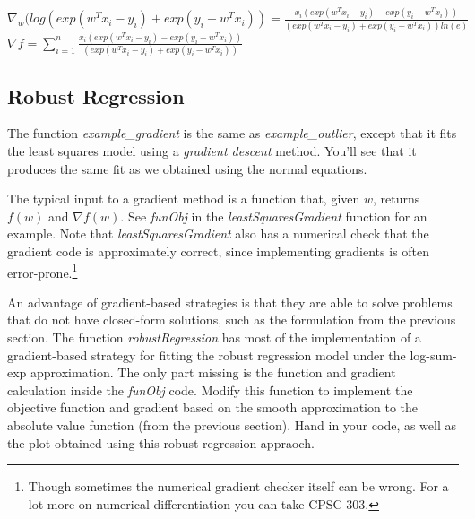 \documentclass{article}
\def\blu#1{{\color{blu}#1}}
\begin{document}
$\nabla _w(log(exp(w^Tx_i-y_i)+exp(y_i-w^Tx_i))= \frac{x_i(exp(w^Tx_i-y_i)-exp(y_i-w^Tx_i))}{(exp(w^Tx_i-y_i)+exp(y_i-w^Tx_i))ln(e)}$\\
$\nabla f= \sum\limits_{i=1}^{n}\frac{x_i(exp(w^Tx_i-y_i)-exp(y_i-w^Tx_i))}{(exp(w^Tx_i-y_i)+exp(y_i-w^Tx_i))}$

\subsection{Robust Regression}

The function \emph{example\_gradient} is the same as \emph{example\_outlier}, except that it fits the least squares model using a \emph{gradient descent} method. You'll see that it produces the same fit as we obtained using the normal equations.

The typical input to a gradient method is a function that, given $w$, returns $f(w)$ and $\nabla f(w)$. See \emph{funObj} in the \emph{leastSquaresGradient} function for an example. Note that \emph{leastSquaresGradient} also has a numerical check that the gradient code is approximately correct, since implementing gradients is often error-prone.\footnote{Though sometimes the numerical gradient checker itself can be wrong. For a lot more on numerical differentiation you can take CPSC 303.}

An advantage of gradient-based strategies is that they are able to solve problems that do not have closed-form solutions, such as the formulation from the previous section. The function \emph{robustRegression} has most of the implementation of a gradient-based strategy for fitting the robust regression model under the log-sum-exp approximation. The only part missing is the function and gradient calculation inside the \emph{funObj} code. \blu{Modify this function to implement the objective function and gradient based on the smooth approximation to the absolute value function (from the previous section). Hand in your code, as well as the plot obtained using this robust regression appraoch.}
\end{document}
